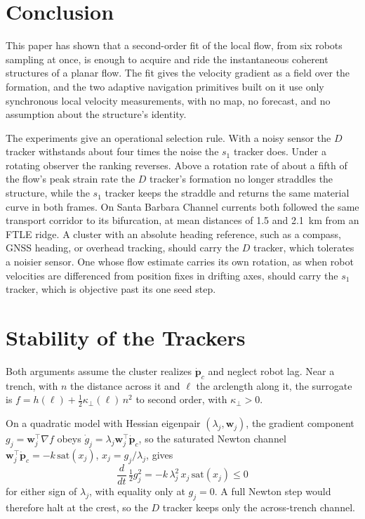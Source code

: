 \documentclass[lettersize,journal]{IEEEtran}
\begin{document}
\section{Conclusion}

This paper has shown that a second-order fit of the local flow, from six
robots sampling at once, is enough to acquire and ride the instantaneous
coherent structures of a planar flow. The fit gives the velocity gradient
as a field over the formation, and the two adaptive navigation primitives
built on it use only synchronous local velocity measurements, with no
map, no forecast, and no assumption about the structure's identity.

The experiments give an operational selection rule. With a noisy sensor
the $D$ tracker withstands about four times the noise the $s_1$ tracker does. Under a rotating observer the
ranking reverses. Above a rotation rate of about a fifth of the flow's peak strain rate the $D$ tracker's formation
no longer straddles the structure, while the $s_1$ tracker keeps the
straddle and returns the same material curve in both frames. On Santa Barbara Channel currents both followed the same transport corridor
to its bifurcation, at mean distances of 1.5 and 2.1~km from an FTLE ridge. A cluster with an absolute heading reference, such as a compass, GNSS
heading, or overhead tracking, should carry the $D$ tracker, which
tolerates a noisier sensor. One whose flow estimate carries its own rotation, as when robot
velocities are differenced from position fixes in drifting axes, should
carry the $s_1$ tracker, which is objective past its one seed step.

\appendices

\section{Stability of the Trackers}
\label{app:stability}

Both arguments assume the cluster realizes $\dot{\mathbf{p}}_c$
\cite{35,3} and neglect robot lag. Near a trench, with $n$ the distance
across it and $\ell$ the arclength along it, the surrogate is
$f = h(\ell) + \tfrac{1}{2}\kappa_\perp(\ell)\,n^2$ to second order, with
$\kappa_\perp > 0$.

On a quadratic model with Hessian eigenpair $(\lambda_j, \mathbf{w}_j)$,
the gradient component $g_j = \mathbf{w}_j^\top\nabla f$ obeys
$\dot{g}_j = \lambda_j\mathbf{w}_j^\top\dot{\mathbf{p}}_c$, so the
saturated Newton channel
$\mathbf{w}_j^\top\dot{\mathbf{p}}_c = -k\,\mathrm{sat}(x_j)$,
$x_j = g_j/\lambda_j$, gives
\begin{equation}
    \frac{d}{dt}\,\tfrac{1}{2}g_j^2
    = -k\,\lambda_j^2\,x_j\,\mathrm{sat}(x_j) \leq 0
    \label{eq:newton_lyap}
\end{equation}
for either sign of $\lambda_j$, with equality only at $g_j = 0$. A full
Newton step would therefore halt at the crest, so the $D$ tracker keeps
only the across-trench channel.
\end{document}
